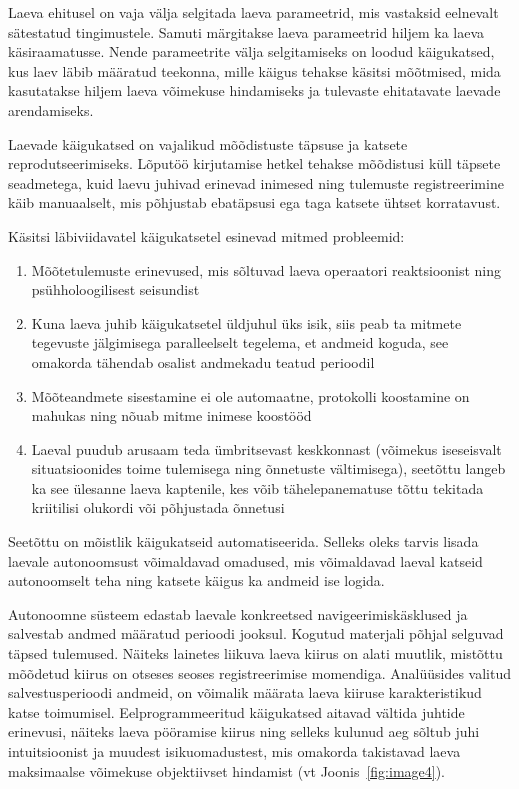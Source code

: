 
Laeva ehitusel on vaja välja selgitada laeva parameetrid, mis vastaksid eelnevalt sätestatud tingimustele. Samuti märgitakse laeva parameetrid hiljem ka laeva käsiraamatusse. Nende parameetrite välja selgitamiseks on loodud käigukatsed, kus laev läbib määratud teekonna, mille käigus tehakse käsitsi mõõtmised, mida kasutatakse hiljem laeva võimekuse hindamiseks ja tulevaste ehitatavate laevade arendamiseks.

Laevade käigukatsed on vajalikud mõõdistuste täpsuse ja katsete reprodutseerimiseks. Lõputöö kirjutamise hetkel tehakse mõõdistusi küll täpsete seadmetega, kuid laevu juhivad erinevad inimesed ning tulemuste registreerimine käib manuaalselt, mis põhjustab ebatäpsusi ega taga katsete ühtset korratavust.

Käsitsi läbiviidavatel käigukatsetel esinevad mitmed probleemid:

\begin{enumerate}
\def\labelenumi{\arabic{enumi}.}
\item
  Mõõtetulemuste erinevused, mis sõltuvad laeva operaatori reaktsioonist ning psühholoogilisest seisundist
\item
  Kuna laeva juhib käigukatsetel üldjuhul üks isik, siis peab ta mitmete tegevuste jälgimisega paralleelselt tegelema, et andmeid koguda, see omakorda tähendab osalist andmekadu teatud perioodil
\item
  Mõõteandmete sisestamine ei ole automaatne, protokolli koostamine on mahukas ning nõuab mitme inimese koostööd
\item
  Laeval puudub arusaam teda ümbritsevast keskkonnast (võimekus iseseisvalt situatsioonides toime tulemisega ning õnnetuste vältimisega), seetõttu langeb ka see ülesanne laeva kaptenile, kes võib tähelepanematuse tõttu tekitada kriitilisi olukordi või põhjustada õnnetusi
\end{enumerate}

Seetõttu on mõistlik käigukatseid automatiseerida. Selleks oleks tarvis lisada laevale autonoomsust võimaldavad omadused, mis võimaldavad laeval katseid autonoomselt teha ning katsete käigus ka andmeid ise logida.

Autonoomne süsteem edastab laevale konkreetsed navigeerimiskäsklused ja salvestab andmed määratud perioodi jooksul. Kogutud materjali põhjal selguvad täpsed tulemused. Näiteks lainetes liikuva laeva kiirus on alati muutlik, mistõttu mõõdetud kiirus on otseses seoses registreerimise momendiga. Analüüsides valitud salvestusperioodi andmeid, on võimalik määrata laeva kiiruse karakteristikud katse toimumisel. Eelprogrammeeritud käigukatsed aitavad vältida juhtide erinevusi, näiteks laeva pööramise kiirus ning selleks kulunud aeg sõltub juhi intuitsioonist ja muudest isikuomadustest, mis omakorda takistavad laeva maksimaalse võimekuse objektiivset hindamist \cite{ref13} (vt Joonis~\ref{fig:image4}).

